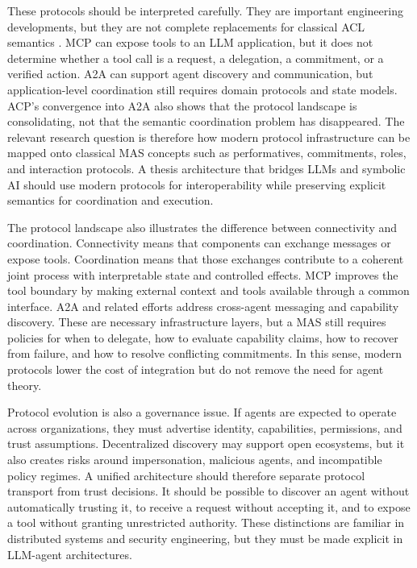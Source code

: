 These protocols should be interpreted carefully. They are important engineering developments, but they are not complete replacements for classical ACL semantics \cite{ehtesham2025survey}. MCP can expose tools to an LLM application, but it does not determine whether a tool call is a request, a delegation, a commitment, or a verified action. A2A can support agent discovery and communication, but application-level coordination still requires domain protocols and state models. ACP's convergence into A2A also shows that the protocol landscape is consolidating, not that the semantic coordination problem has disappeared. The relevant research question is therefore how modern protocol infrastructure can be mapped onto classical MAS concepts such as performatives, commitments, roles, and interaction protocols. A thesis architecture that bridges LLMs and symbolic AI should use modern protocols for interoperability while preserving explicit semantics for coordination and execution.

The protocol landscape also illustrates the difference between connectivity and coordination. Connectivity means that components can exchange messages or expose tools. Coordination means that those exchanges contribute to a coherent joint process with interpretable state and controlled effects. MCP improves the tool boundary by making external context and tools available through a common interface. A2A and related efforts address cross-agent messaging and capability discovery. These are necessary infrastructure layers, but a MAS still requires policies for when to delegate, how to evaluate capability claims, how to recover from failure, and how to resolve conflicting commitments. In this sense, modern protocols lower the cost of integration but do not remove the need for agent theory.

Protocol evolution is also a governance issue. If agents are expected to operate across organizations, they must advertise identity, capabilities, permissions, and trust assumptions. Decentralized discovery may support open ecosystems, but it also creates risks around impersonation, malicious agents, and incompatible policy regimes. A unified architecture should therefore separate protocol transport from trust decisions. It should be possible to discover an agent without automatically trusting it, to receive a request without accepting it, and to expose a tool without granting unrestricted authority. These distinctions are familiar in distributed systems and security engineering, but they must be made explicit in LLM-agent architectures.

